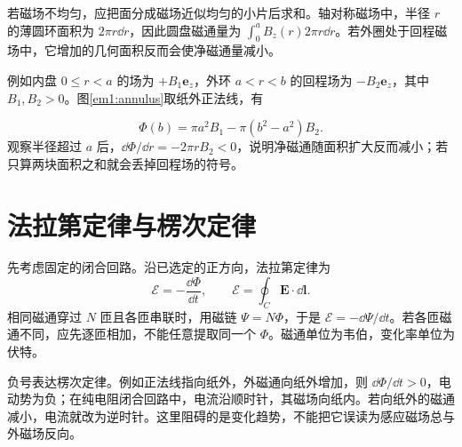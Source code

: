 若磁场不均匀，应把面分成磁场近似均匀的小片后求和。轴对称磁场中，半径 $r$ 的薄圆环面积为 $2\pi r\dd r$，因此圆盘磁通量为 $\int_0^a B_z(r)2\pi r\dd r$。若外圈处于回程磁场中，它增加的几何面积反而会使净磁通量减小。


例如内盘 $0\le r<a$ 的场为 $+B_1\bm e_z$，外环 $a<r<b$ 的回程场为 $-B_2\bm e_z$，其中 $B_1,B_2>0$。图\ref{em1:annulus}取纸外正法线，有

\[
\Phi(b)=\pi a^2B_1-\pi(b^2-a^2)B_2.
\]
观察半径超过 $a$ 后，$\dd\Phi/\dd r=-2\pi rB_2<0$，说明净磁通随面积扩大反而减小；若只算两块面积之和就会丢掉回程场的符号。


\section{法拉第定律与楞次定律}

先考虑固定的闭合回路。沿已选定的正方向，法拉第定律为
\begin{equation}\mathcal E=-\frac{\dd\Phi}{\dd t},\qquad
\mathcal E=\oint_C\bm E\cdot\dd\bm l.\label{em1:faraday}\end{equation}
相同磁通穿过 $N$ 匝且各匝串联时，用磁链 $\Psi=N\Phi$，于是 $\mathcal E=-\dd\Psi/\dd t$。若各匝磁通不同，应先逐匝相加，不能任意提取同一个 $\Phi$。磁通单位为韦伯，变化率单位为伏特。


负号表达楞次定律。例如正法线指向纸外，外磁通向纸外增加，则 $\dd\Phi/\dd t>0$，电动势为负；在纯电阻闭合回路中，电流沿顺时针，其磁场向纸内。若向纸外的磁通减小，电流就改为逆时针。这里阻碍的是变化趋势，不能把它误读为感应磁场总与外磁场反向。


